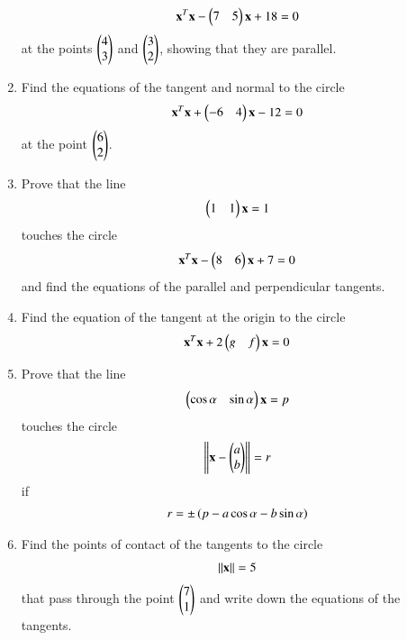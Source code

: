 \begin{enumerate}[label=\arabic*.,ref=\thesubsection.\theenumi]
\begin{align}
\mathbf{x}^T\mathbf{x}-\begin{pmatrix}7 & 5\end{pmatrix}\mathbf{x}+18 = 0
\end{align}
at the points $\begin{pmatrix}4\\3\end{pmatrix}$ and $\begin{pmatrix}3\\2\end{pmatrix}$, showing that they are parallel.
\item Find the equations of the tangent and normal to the circle
\begin{align}
\mathbf{x}^T\mathbf{x}+\begin{pmatrix}-6 & 4\end{pmatrix}\mathbf{x}-12 = 0
\end{align}
at the point $\begin{pmatrix}6\\2\end{pmatrix}$.
\item Prove that the line 
\begin{align}
\begin{pmatrix}1 & 1\end{pmatrix}\mathbf{x} = 1
\end{align}
touches the circle
\begin{align}
\mathbf{x}^T\mathbf{x}-\begin{pmatrix}8 & 6\end{pmatrix}\mathbf{x}+7 = 0
\end{align}
and find the equations of the parallel and perpendicular tangents.
\renewcommand{\theequation}{\theenumi}
\item Find the equation of the tangent at the origin to the circle
\begin{align}
\mathbf{x}^T\mathbf{x}+2\begin{pmatrix}g & f\end{pmatrix}\mathbf{x} = 0
\end{align}
%
\item Prove that the line 
\begin{align}
\begin{pmatrix}\cos\alpha &\sin\alpha\end{pmatrix}\mathbf{x} = p
\end{align}
touches the circle
\begin{align}
\left\lVert\mathbf{x}-\begin{pmatrix}a\\b\end{pmatrix}\right\rVert=r
\end{align}
if
\begin{align}
r = \pm \left(p-a\cos\alpha-b\sin\alpha\right)
\end{align}
\renewcommand{\theequation}{\theenumi}
\item Find the points of contact of the tangents to the circle
\begin{align}
\left\lVert\mathbf{x}\right\rVert=5
\end{align}
that pass through the point $\begin{pmatrix}7\\1\end{pmatrix}$ and write down the equations of the tangents.


\end{enumerate}
